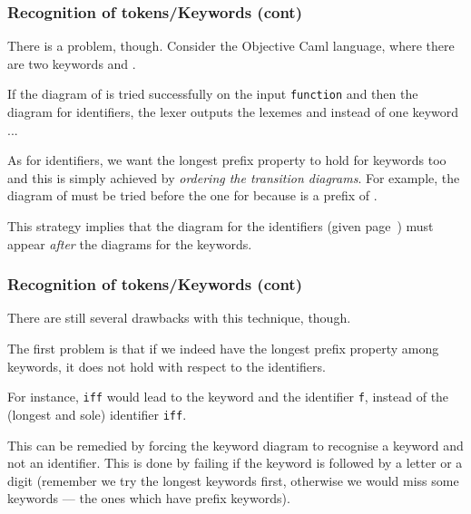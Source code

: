 % 
\begin{frame}
\frametitle{Recognition of tokens/Keywords (cont)}

There is a problem, though. Consider the Objective Caml language,
where there are two keywords  and .

\bigskip

If the diagram of  is tried successfully on the input
\texttt{function} and then the diagram for identifiers, the lexer
outputs the lexemes  and  instead of one
keyword ...

\bigskip

As for identifiers, we want the longest prefix property to hold for
keywords too and this is simply achieved by \emph{ordering the
  transition diagrams}. For example, the diagram of 
must be tried before the one for  because  is a
prefix of .

\bigskip

This strategy implies that the diagram for the identifiers (given
page~\pageref{dfa_ident}) must appear \emph{after} the diagrams for
the keywords.

\end{frame}

% 
\begin{frame}
\frametitle{Recognition of tokens/Keywords (cont)}

There are still several drawbacks with this technique, though.

\bigskip

The first problem is that if we indeed have the longest prefix
property among keywords, it does not hold with respect to the
identifiers. 

\bigskip

For instance, \texttt{iff} would lead to the keyword  and the
identifier \texttt{f}, instead of the (longest and sole)
identifier \texttt{iff}.

\bigskip

This can be remedied by forcing the keyword diagram to recognise a
keyword and not an identifier. This is done by failing if the keyword
is followed by a letter or a digit (remember we try the longest
keywords first, otherwise we would miss some keywords --- the ones
which have prefix keywords).

\end{frame}

